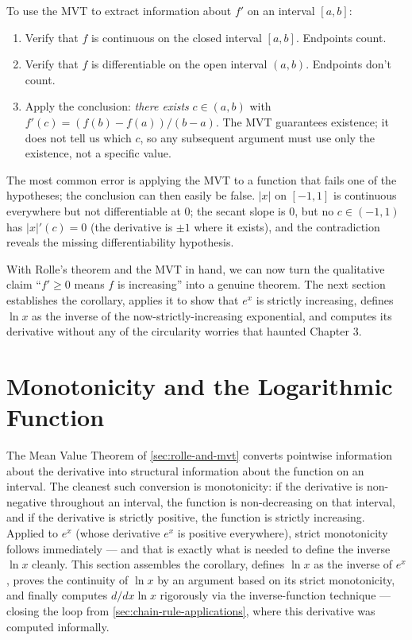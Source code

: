 \begin{strategy}
To use the MVT to extract information about \(f'\) on an interval \([a, b]\):
\begin{enumerate}
    \item Verify that \(f\) is continuous on the closed interval \([a, b]\). Endpoints count.
    \item Verify that \(f\) is differentiable on the open interval \((a, b)\). Endpoints don't count.
    \item Apply the conclusion: \emph{there exists} \(c \in (a, b)\) with \(f'(c) = (f(b) - f(a))/(b - a)\). The MVT guarantees existence; it does not tell us which \(c\), so any subsequent argument must use only the existence, not a specific value.
\end{enumerate}
The most common error is applying the MVT to a function that fails one of the hypotheses; the conclusion can then easily be false. \(\lvert x \rvert\) on \([-1, 1]\) is continuous everywhere but not differentiable at \(0\); the secant slope is \(0\), but no \(c \in (-1, 1)\) has \(\lvert x \rvert' (c) = 0\) (the derivative is \(\pm 1\) where it exists), and the contradiction reveals the missing differentiability hypothesis.
\end{strategy}

With Rolle's theorem and the MVT in hand, we can now turn the qualitative claim ``\(f' \geq 0\) means \(f\) is increasing'' into a genuine theorem. The next section establishes the corollary, applies it to show that \(e^{x}\) is strictly increasing, defines \(\ln x\) as the inverse of the now-strictly-increasing exponential, and computes its derivative without any of the circularity worries that haunted Chapter 3.

\section{Monotonicity and the Logarithmic Function}\label{sec:logarithm}

The Mean Value Theorem of \cref{sec:rolle-and-mvt} converts pointwise information about the derivative into structural information about the function on an interval. The cleanest such conversion is monotonicity: if the derivative is non-negative throughout an interval, the function is non-decreasing on that interval, and if the derivative is strictly positive, the function is strictly increasing. Applied to \(e^{x}\) (whose derivative \(e^{x}\) is positive everywhere), strict monotonicity follows immediately --- and that is exactly what is needed to define the inverse \(\ln x\) cleanly. This section assembles the corollary, defines \(\ln x\) as the inverse of \(e^{x}\), proves the continuity of \(\ln x\) by an argument based on its strict monotonicity, and finally computes \(d/dx \ln x\) rigorously via the inverse-function technique --- closing the loop from \cref{sec:chain-rule-applications}, where this derivative was computed informally.

